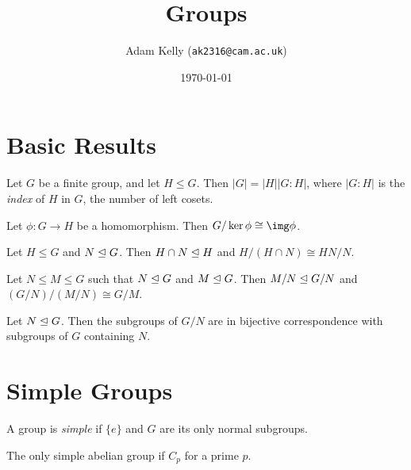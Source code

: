 \documentclass[a4paper]{amsart}
\title{Groups}
\author{Adam Kelly (\texttt{ak2316@cam.ac.uk})}
\date{\today}
\begin{document}
\maketitle

\section{Basic Results}

\begin{theorem}[Lagrange]
	Let $G$ be a finite group, and let $H \leq G$. Then $|G| = |H| |G:H|$, where $|G:H|$ is the \emph{index} of $H$ in $G$, the number of left cosets.
\end{theorem}

\begin{theorem}
	Let $\phi: G \rightarrow H$ be a homomorphism. Then $G/\ker \phi \cong \img \phi$.
\end{theorem}

\begin{theorem}
	Let $H \leq G$ and $N \trianglelefteq G$. Then $H \cap N \trianglelefteq H$ and $H/(H \cap N) \cong HN/N$.
\end{theorem}

\begin{theorem}
	Let $N \leq M \leq G$ such that $N \trianglelefteq G$ and $M \trianglelefteq G$. Then $M/N \trianglelefteq G/N$ and $(G/N) / (M/N) \cong G/M$.
\end{theorem}

\begin{theorem}
	Let $N \trianglelefteq G$. Then the subgroups of $G/N$ are in bijective correspondence with subgroups of $G$ containing $N$.
\end{theorem}

\section{Simple Groups}

\begin{definition}
	A group is \emph{simple} if $\{e\}$ and $G$ are its only normal subgroups.
\end{definition}

\begin{lemma}
	The only simple abelian group if $C_p$ for a prime $p$.
\end{lemma}
\end{document}
